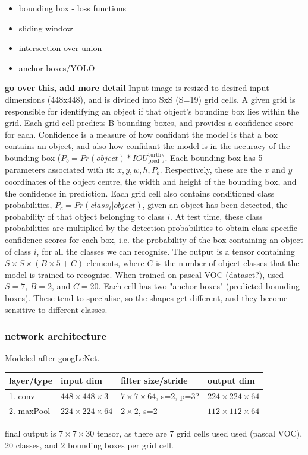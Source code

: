 \documentclass{article}
\begin{document}
\begin{itemize}
	\item bounding box - loss functions
	\item sliding window
	\item intersection over union
	\item anchor boxes/YOLO
\end{itemize}
{\bf go over this, add more detail}
Input image is resized to desired input dimensions (448x448), and is divided into SxS (S=19) grid cells. A given grid is responsible for identifying an object if that object's bounding box lies within the grid. Each grid cell predicts B bounding boxes, and provides a confidence score for each. Confidence is a measure of how confidant the model is that a box contains an object, and also how confidant the model is in the accuracy of the bounding box ($P_b = Pr(object) * IOU_\mathrm{pred}^\mathrm{turth}$). Each bounding box has 5 parameters associated with it: $x,y,w,h,P_b$. Respectively, these are the $x$ and $y$ coordinates of the object centre, the width and height of the bounding box, and the confidence in prediction. Each grid cell also contains conditioned class probabilities, $P_c= Pr(class_i|object)$, given an object has been detected, the probability of that object belonging to class $i$. At test time, these class probabilities are multiplied by the detection probabilities to obtain class-specific confidence scores for each box, i.e. the probability of the box containing an object of class $i$, for all the classes we can recognise. The output is a tensor containing $S\times S\times( B\times 5 + C)$ elements, where $C$ is the number of object classes that the model is trained to recognise.
When trained on pascal VOC (dataset?), used $S = 7$, $B = 2$, and $C=20$. 
Each cell has two "anchor boxes" (predicted bounding boxes). These tend to specialise, so the shapes get different, and they become sensitive to different classes.

\subsubsection{network architecture}
Modeled after googLeNet. 
\begin{table}[hbp]
\begin{tabular}{|l|l|l|l|}
\hline
layer/type & input dim & filter size/stride & output dim \\
\hline
1. conv & $448 \times448 \times 3$ & $7 \times 7\times 64$, s=2, p=3? & $224 \times 224 \times 64$ \\
2. maxPool & $224\times224\times64$ & $2\times2$, s=2 & $112\times112\times64 $ \\
\hline

\end{tabular}
\end{table}
final output is $7\times7\times30$ tensor, as there are 7 grid cells used used (pascal VOC), 20 classes, and 2 bounding boxes per grid cell.
\end{document}
